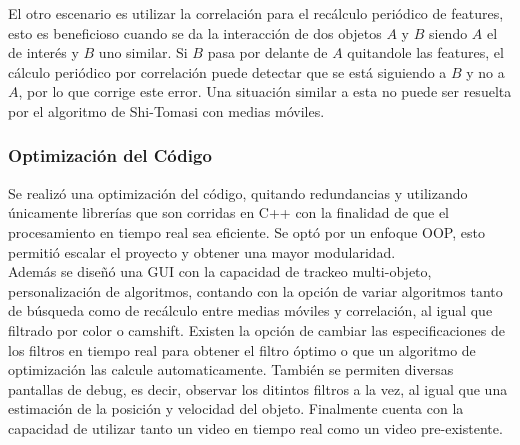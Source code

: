 El otro escenario es utilizar la correlación para el recálculo periódico de features, esto es beneficioso cuando se da la interacción de dos objetos $A$ y $B$ siendo $A$ el de interés y $B$ uno similar. Si $B$ pasa por delante de $A$ quitandole las features, el cálculo periódico por correlación puede detectar que se está siguiendo a $B$ y no a $A$, por lo que corrige este error. Una situación similar a esta no puede ser resuelta por el algoritmo de Shi-Tomasi con medias móviles.



































\subsubsection{Optimización del Código}
Se realizó una optimización del código, quitando redundancias y utilizando únicamente librerías que son corridas en C++ con la finalidad de que el procesamiento en tiempo real sea eficiente. Se optó por un enfoque OOP, esto permitió escalar el proyecto y obtener una mayor modularidad. \\
Además se diseñó una GUI con la capacidad de trackeo multi-objeto, personalización de algoritmos, contando con la opción de variar algoritmos tanto de búsqueda como de recálculo entre medias móviles y correlación, al igual que filtrado por color o camshift. Existen la opción de cambiar las especificaciones de los filtros en tiempo real para obtener el filtro óptimo o que un algoritmo de optimización las calcule automaticamente. También se permiten diversas pantallas de debug, es decir, observar los ditintos filtros a la vez, al igual que una estimación de la posición y velocidad del objeto. Finalmente cuenta con la capacidad de utilizar tanto un video en tiempo real como un video pre-existente.





